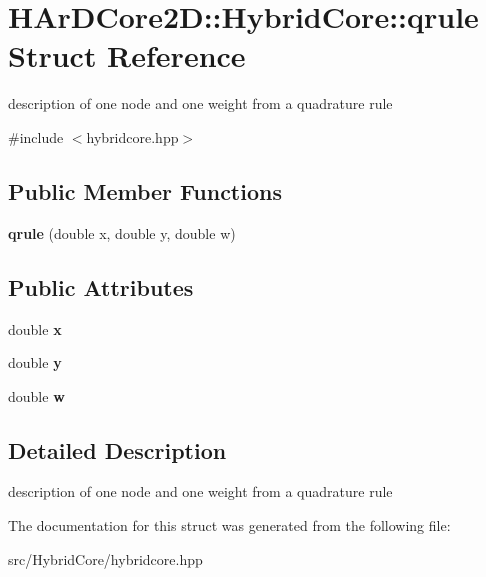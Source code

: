 \hypertarget{structHArDCore2D_1_1HybridCore_1_1qrule}{}\section{H\+Ar\+D\+Core2D\+:\+:Hybrid\+Core\+:\+:qrule Struct Reference}
\label{structHArDCore2D_1_1HybridCore_1_1qrule}


description of one node and one weight from a quadrature rule  




{\ttfamily \#include $<$hybridcore.\+hpp$>$}

\subsection*{Public Member Functions}
\begin{DoxyCompactItemize}
\item 
\mbox{\label{structHArDCore2D_1_1HybridCore_1_1qrule_ae3e8af15fb16e965ae4473ea1b63b91b}} 
{\bfseries qrule} (double x, double y, double w)
\end{DoxyCompactItemize}
\subsection*{Public Attributes}
\begin{DoxyCompactItemize}
\item 
\mbox{\label{structHArDCore2D_1_1HybridCore_1_1qrule_aa0949349d77246716dab1b949b29dcc4}} 
double {\bfseries x}
\item 
\mbox{\label{structHArDCore2D_1_1HybridCore_1_1qrule_a1de7c1f4777b991609cf13fb33ea9cc3}} 
double {\bfseries y}
\item 
\mbox{\label{structHArDCore2D_1_1HybridCore_1_1qrule_ae2dc056e1cd6d7fec1016f697e476890}} 
double {\bfseries w}
\end{DoxyCompactItemize}


\subsection{Detailed Description}
description of one node and one weight from a quadrature rule 

The documentation for this struct was generated from the following file\+:\begin{DoxyCompactItemize}
\item 
src/\+Hybrid\+Core/hybridcore.\+hpp\end{DoxyCompactItemize}
